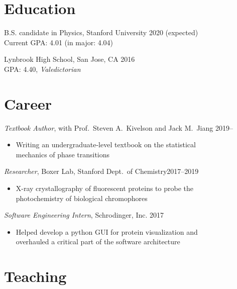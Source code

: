 \documentclass[margin,11pt]{res}
\newenvironment{myitemize}
{ \vspace{-1.5\topsep} \begin{itemize} \setlength\itemsep{0em}}
{ \end{itemize} \vspace{-1.0\topsep}}
\begin{document}
\address{jeffjar@stanford.edu --- \url{https://stanford.edu/~jeffjar}}

\begin{resume}

\section{Education}

B.S. candidate in Physics, Stanford University \hfill 2020 (expected) \\
Current GPA: 4.01 (in major: 4.04)
 
Lynbrook High School, San Jose, CA \hfill 2016 \\
GPA: 4.40, \textit{Valedictorian}

\section{Career}

\textit{Textbook Author}, with Prof.\ Steven A.\ Kivelson and Jack M.\ Jiang  \hfill 2019--\\
\begin{myitemize}
    \item Writing an undergraduate-level textbook on the statistical\\
        mechanics of phase transitions
\end{myitemize}

\textit{Researcher}, Boxer Lab, Stanford Dept.\ of Chemistry\hfill 2017--2019 \\
\begin{myitemize}
    \item X-ray crystallography of fluorescent proteins to probe the\\ photochemistry of biological chromophores
\end{myitemize}

\textit{Software Engineering Intern}, Schrodinger, Inc. \hfill 2017 \\
\begin{myitemize}
    \item Helped develop a python GUI for protein visualization and \\overhauled a critical part of the software architecture
\end{myitemize}

\section{Teaching}


\end{resume}
\end{document}
